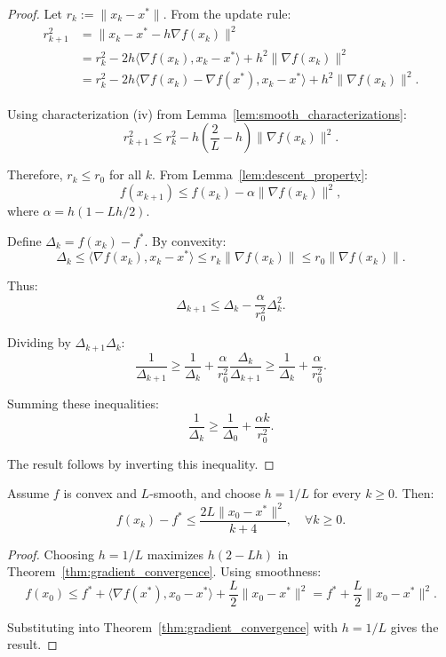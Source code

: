 \begin{proof}
  Let $r_k := \|x_k - x^*\|$. From the update rule:
  \begin{align}
    r_{k+1}^2 &= \|x_k - x^* - h\nabla f(x_k)\|^2 \\
    &= r_k^2 - 2h\langle\nabla f(x_k), x_k - x^*\rangle + h^2\|\nabla f(x_k)\|^2 \\
    &= r_k^2 - 2h\langle\nabla f(x_k) - \nabla f(x^*), x_k - x^*\rangle + h^2\|\nabla f(x_k)\|^2.
  \end{align}
  
  Using characterization (iv) from Lemma~\ref{lem:smooth_characterizations}:
  \[
    r_{k+1}^2 \leq r_k^2 - h\left(\frac{2}{L} - h\right)\|\nabla f(x_k)\|^2.
  \]
  
  Therefore, $r_k \leq r_0$ for all $k$. From Lemma~\ref{lem:descent_property}:
  \[
    f(x_{k+1}) \leq f(x_k) - \alpha\|\nabla f(x_k)\|^2,
  \]
  where $\alpha = h(1 - Lh/2)$.
  
  Define $\Delta_k = f(x_k) - f^*$. By convexity:
  \[
    \Delta_k \leq \langle\nabla f(x_k), x_k - x^*\rangle \leq r_k\|\nabla f(x_k)\| \leq r_0\|\nabla f(x_k)\|.
  \]
  
  Thus:
  \[
    \Delta_{k+1} \leq \Delta_k - \frac{\alpha}{r_0^2}\Delta_k^2.
  \]
  
  Dividing by $\Delta_{k+1}\Delta_k$:
  \[
    \frac{1}{\Delta_{k+1}} \geq \frac{1}{\Delta_k} + \frac{\alpha}{r_0^2}\frac{\Delta_k}{\Delta_{k+1}} \geq \frac{1}{\Delta_k} + \frac{\alpha}{r_0^2}.
  \]
  
  Summing these inequalities:
  \[
    \frac{1}{\Delta_k} \geq \frac{1}{\Delta_0} + \frac{\alpha k}{r_0^2}.
  \]
  
  The result follows by inverting this inequality.
\end{proof}

\begin{corollary}
  \label{cor:optimal_stepsize}
  \leanok
  Assume $f$ is convex and $L$-smooth, and choose $h = 1/L$ for every $k \geq 0$. Then:
  \[
    f(x_k) - f^* \leq \frac{2L\|x_0 - x^*\|^2}{k + 4}, \quad \forall k \geq 0.
  \]
\end{corollary}

\begin{proof}
  Choosing $h = 1/L$ maximizes $h(2 - Lh)$ in Theorem~\ref{thm:gradient_convergence}. Using smoothness:
  \[
    f(x_0) \leq f^* + \langle\nabla f(x^*), x_0 - x^*\rangle + \frac{L}{2}\|x_0 - x^*\|^2 = f^* + \frac{L}{2}\|x_0 - x^*\|^2.
  \]
  
  Substituting into Theorem~\ref{thm:gradient_convergence} with $h = 1/L$ gives the result.
\end{proof}

